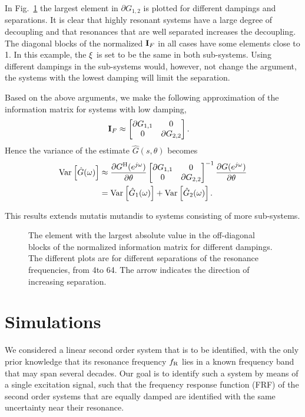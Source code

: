 In Fig.~\ref{fig:coupling} the largest element in $\partial G_{1,2}$ is plotted for different dampings and separations. It is clear that highly resonant systems have a large degree of decoupling and that resonances that are well separated increases the decoupling. The diagonal blocks of the normalized $\mathbf{I}_F$ in all cases have some elements close to 1. In this example, the $\xi$ is set to be the same in both sub-systems. Using different dampings in the sub-systems would, however, not change the argument, the systems with the lowest damping will limit the separation.

Based on the above arguments, we make the following approximation of the information matrix for systems with low damping,
\begin{align}
\mathbf{I}_F&\approx \begin{bmatrix}\partial G_{1,1} &0\\
                        0&\partial G_{2,2}\end{bmatrix}.
\end{align}
Hence the variance of the estimate $\hat{G}(s,\theta)$ becomes
\begin{align}
\operatorname{\mathrm{Var}}_{} \left[ \hat{G}(\omega) \right] &\approx \frac{\partial G^{\mathrm{H}}(e^{j\omega})}{\partial \theta}\begin{bmatrix}\partial G_{1,1} &0\\
                        0&\partial G_{2,2}\end{bmatrix}^{-1}\frac{\partial G(e^{j\omega})}{\partial \theta}\\
&=\operatorname{\mathrm{Var}}_{} \left[ \hat{G}_1(\omega) \right] + \operatorname{\mathrm{Var}}_{} \left[ \hat{G}_2(\omega) \right].
\end{align}

This results extends mutatis mutandis to systems consisting of more sub-systems.

\begin{figure}
\centering

\caption{The element with the largest absolute value in the off-diagonal blocks of the normalized information matrix for different dampings.
         The different plots are for different separations of the resonance frequencies, from 4\wdB to 64\wdB.
         The arrow indicates the direction of increasing separation.}
\label{fig:coupling}
\end{figure}

\section{Simulations}\label{sec:sim}
We considered a linear second order system that is to be identified, with the
only prior knowledge that its resonance frequency $f_{\mathrm{R}}$ lies in a known
frequency band that may span several decades. 
Our goal is to identify such a system by means of a single excitation signal, 
such that the frequency response function (FRF) of the second order systems that are
equally damped are identified with the same uncertainty near their resonance.

